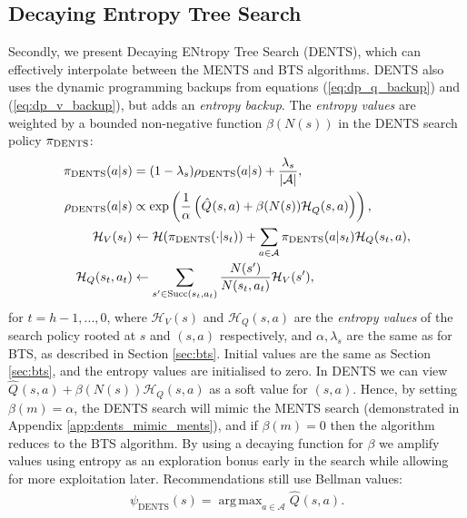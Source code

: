 \documentclass{article}
\newcommand{\cl}[1]{\mathcal{#1}}
\newcommand{\Qt}[3]{\hat{Q}^{#3}(#1,#2)}
\newcommand{\succc}[2]{\textnormal{Succ}(#1,#2)}
\DeclareMathOperator*{\argmax}{arg\,max}
\theoremstyle{plain}
\begin{document}
    \subsection{Decaying Entropy Tree Search} \label{sec:dents}
        Secondly, we present Decaying ENtropy Tree Search (DENTS), which can effectively interpolate between the MENTS and BTS algorithms. DENTS also uses the dynamic programming backups from equations (\ref{eq:dp_q_backup}) and (\ref{eq:dp_v_backup}), but adds an \textit{entropy backup}. The \textit{entropy values} are weighted by a bounded non-negative function $\beta(N(s))$ in the DENTS search policy $\pi_{\textnormal{DENTS}}$:
        \begin{align}
            \pi_{\textnormal{DENTS}}(a|s) &= (1-\lambda_s)\rho_{\textnormal{DENTS}}(a|s) + \frac{\lambda_s}{|\cl{A}|}, \label{eq:dents_search_policy} \\
            \rho_{\textnormal{DENTS}}(a|s) &\propto \exp\left(\frac{1}{\alpha}\left(\Qt{s}{a}{} + \beta(N(s))\cl{H}_Q^{}(s,a) \right)\right), \label{eq:dents_policy} \\
            \cl{H}_V(s_t) &\leftarrow \cl{H}(\pi_{\textnormal{DENTS}}(\cdot | s_t)) + \sum_{a\in\cl{A}} \pi_{\textnormal{DENTS}}(a|s_t)\cl{H}_Q(s_t,a), \label{eq:entropy_v} \\
            \cl{H}_Q(s_t,a_t) &\leftarrow \sum_{s'\in \succc{s_t}{a_t}} \frac{N(s')}{N(s_t,a_t)} \cl{H}_V(s'),  %
        \end{align}
        for $t=h-1,...,0$, where $\cl{H}_V(s)$ and $\cl{H}_Q(s,a)$ are the \textit{entropy values} of the search policy rooted at $s$ and $(s,a)$ respectively, and $\alpha,\lambda_s$ are the same as for BTS, as described in Section \ref{sec:bts}. Initial values are the same as Section \ref{sec:bts}, and the entropy values are initialised to zero.  In DENTS we can  view $\Qt{s}{a}{} + \beta(N(s))\cl{H}_Q(s,a)$ as a soft value for $(s,a)$. Hence, by setting $\beta(m)=\alpha$, the DENTS search will mimic the MENTS search (demonstrated in Appendix \ref{app:dents_mimic_ments}), and if $\beta(m)=0$ then the algorithm reduces to the BTS algorithm. By using a decaying function for $\beta$ we amplify values using entropy as an exploration bonus early in the search while allowing for more exploitation later. Recommendations still use 
        Bellman
        values:
        \begin{align}
            \psi_{\text{DENTS}}(s)=\argmax_{a\in\cl{A}}\Qt{s}{a}{}.
        \end{align}
\end{document}
